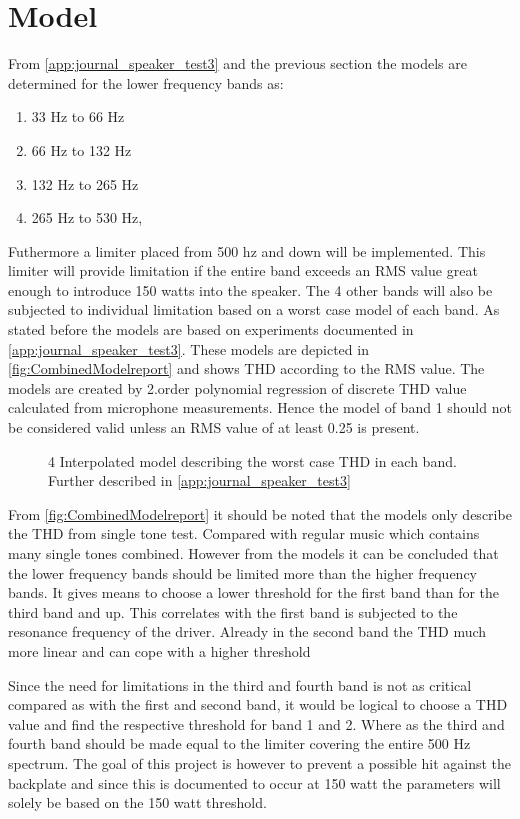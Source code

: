 \section{Model}
From \autoref{app:journal_speaker_test3} and the previous section the models are determined for the lower frequency bands as:
\begin{enumerate}
\item 33 Hz to 66 Hz
\item 66 Hz to 132 Hz
\item 132 Hz to 265 Hz
\item 265 Hz to 530 Hz,
\end{enumerate}
Futhermore a limiter placed from 500 hz and down will be implemented. This limiter will provide limitation if the entire band exceeds an RMS value great enough to introduce 150 watts into the speaker. The 4 other bands will also be subjected to individual limitation based on a worst case model of each band. As stated before the models are based on experiments documented in \autoref{app:journal_speaker_test3}. These models are depicted in \autoref{fig:CombinedModelreport} and shows THD according to the RMS value. The models are created by 2.order polynomial regression of discrete THD value calculated from microphone measurements. Hence the model of band 1 should not be considered valid unless an RMS value of at least 0.25 is present.

\begin{figure}[H]
    \centering
    
    \caption{4 Interpolated model describing the worst case THD in each band. Further described in \autoref{app:journal_speaker_test3}}
    \label{fig:CombinedModelreport}
\end{figure}

From \autoref{fig:CombinedModelreport} it should be noted that the models only describe the THD from single tone test. Compared with regular music which contains many single tones combined. However from the models it can be concluded that the lower frequency bands should be limited more than the higher frequency bands. It gives means to choose a lower threshold for the first band than for the third band and up. This correlates with the first band is subjected to the resonance frequency of the driver. Already in the second band the THD much more linear and can cope with a higher threshold

\vspace{2mm}
Since the need for limitations in the third and fourth band is not as critical compared as with the first and second band, it would be logical to choose a THD value and find the respective threshold for band 1 and 2. Where as the third and fourth band should be made equal to the limiter covering the entire 500 Hz spectrum. The goal of this project is however to prevent a possible hit against the backplate and since this is documented to occur at 150 watt the parameters will solely be based on the 150 watt threshold. 
